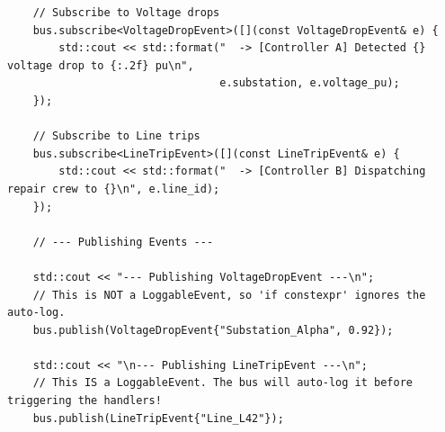 \begin{verbatim}
    // Subscribe to Voltage drops
    bus.subscribe<VoltageDropEvent>([](const VoltageDropEvent& e) {
        std::cout << std::format("  -> [Controller A] Detected {} voltage drop to {:.2f} pu\n", 
                                 e.substation, e.voltage_pu);
    });

    // Subscribe to Line trips
    bus.subscribe<LineTripEvent>([](const LineTripEvent& e) {
        std::cout << std::format("  -> [Controller B] Dispatching repair crew to {}\n", e.line_id);
    });

    // --- Publishing Events ---
    
    std::cout << "--- Publishing VoltageDropEvent ---\n";
    // This is NOT a LoggableEvent, so 'if constexpr' ignores the auto-log.
    bus.publish(VoltageDropEvent{"Substation_Alpha", 0.92});

    std::cout << "\n--- Publishing LineTripEvent ---\n";
    // This IS a LoggableEvent. The bus will auto-log it before triggering the handlers!
    bus.publish(LineTripEvent{"Line_L42"});
\end{verbatim}
